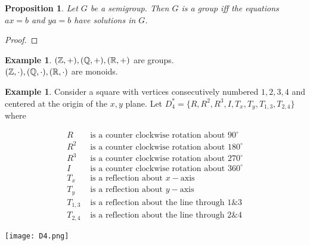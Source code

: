 \documentclass[leqno,DIV=calc,paper=a4,fontsize=11pt]{article}
\newtheorem{prop}[thm]{Proposition}
\theoremstyle{definition}
\newtheorem{exmp}[thm]{Example}
\theoremstyle{plain}
\theoremstyle{remark}
\begin{document}
\begin{prop}
Let $G$ be a semigroup. Then $G$ is a group iff the equations $ax=b$ and $ya=b$ have solutions in $G$.

\end{prop}

\begin{proof}

\end{proof}

\begin{exmp}
$(\Bbb Z,+),(\Bbb Q,+),(\Bbb R,+)$ are groups.\\
$(\Bbb Z,\cdot),(\Bbb Q,\cdot),(\Bbb R,\cdot)$ are monoids.
\end{exmp}

\begin{exmp}
Consider a square with vertices consecutively numbered $1,2,3,4$ and centered at the origin of the $x,y$ plane.
Let $D_4^{*}=\{R,R^2,R^3,I,T_x,T_y,T_{1,3},T_{2,4}\}$
where

\begin{minipage}{0.5\textwidth}
\scriptsize
\begin{align*}
R &\text{ is a counter clockwise rotation about } 90^{\circ}\\
R^2& \text{ is a counter clockwise rotation about } 180^{\circ}\\
R^3& \text{ is a counter clockwise rotation about } 270^{\circ}\\
I &\text{ is a counter clockwise rotation about } 360^{\circ}\\
T_x& \text{ is a reflection about } x-\text{axis}\\
T_y &\text{ is a reflection about } y-\text{axis}\\
T_{1,3}& \text{ is a reflection about the line through } 1\& 3\\
T_{2,4}& \text{ is a reflection about the line through } 2\& 4
\end{align*}
\end{minipage}
\begin{minipage}{0.5\textwidth}
\texttt{[image: D4.png]}
\end{minipage}


\end{exmp}
\end{document}
